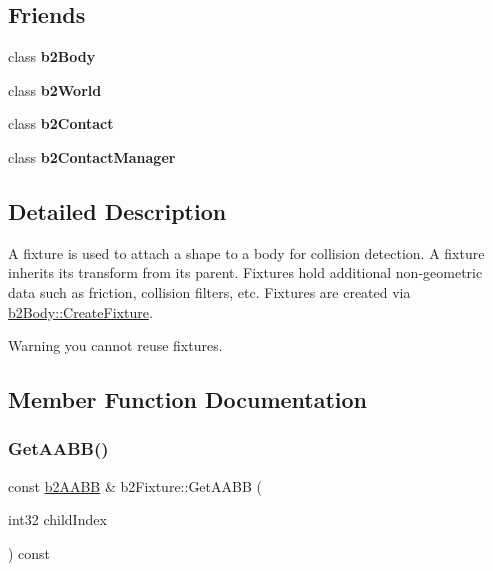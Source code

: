 \subsection*{Friends}
\begin{DoxyCompactItemize}
\item 
\mbox{\label{classb2Fixture_acd34621309c1bdec7335f7545253d704}} 
class {\bfseries b2\+Body}
\item 
\mbox{\label{classb2Fixture_ac7f385a7c800a297a8a6e9be3512e3ab}} 
class {\bfseries b2\+World}
\item 
\mbox{\label{classb2Fixture_ab8681cbb624c63374e16c37686516d3b}} 
class {\bfseries b2\+Contact}
\item 
\mbox{\label{classb2Fixture_a3bbd3ece64fd6a24342844069f4f6ec0}} 
class {\bfseries b2\+Contact\+Manager}
\end{DoxyCompactItemize}


\subsection{Detailed Description}
A fixture is used to attach a shape to a body for collision detection. A fixture inherits its transform from its parent. Fixtures hold additional non-\/geometric data such as friction, collision filters, etc. Fixtures are created via \hyperlink{classb2Body_aa4892301e9b9d62ede5e93dad1743894}{b2\+Body\+::\+Create\+Fixture}. \begin{DoxyWarning}{Warning}
you cannot reuse fixtures. 
\end{DoxyWarning}


\subsection{Member Function Documentation}
\mbox{\label{classb2Fixture_a158574dc389fec83a05b09ab715c4474}} 
\subsubsection{\texorpdfstring{Get\+A\+A\+B\+B()}{GetAABB()}\hspace{0.1cm}{\footnotesize\ttfamily [1/2]}}
{\footnotesize\ttfamily const \hyperlink{structb2AABB}{b2\+A\+A\+BB} \& b2\+Fixture\+::\+Get\+A\+A\+BB (\begin{DoxyParamCaption}\item[{int32}]{child\+Index }\end{DoxyParamCaption}) const\hspace{0.3cm}{\ttfamily [inline]}}

